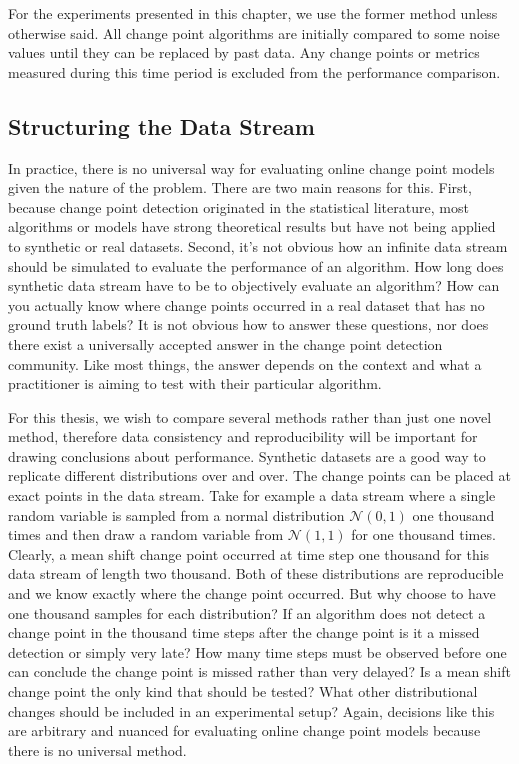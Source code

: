 For the experiments presented in this chapter, we use the former method unless otherwise said. All change point algorithms are initially compared to some noise values until they can be replaced by past data. Any change points or metrics measured during this time period is excluded from the performance comparison. %

\subsection{Structuring the Data Stream}
In practice, there is no universal way for evaluating online change point models given the nature of the problem. There are two main reasons for this. First, because change point detection originated in the statistical literature, most algorithms or models have strong theoretical results but have not being applied to synthetic or real datasets. Second, it's not obvious how an infinite data stream should be simulated to evaluate the performance of an algorithm. How long does synthetic data stream have to be to objectively evaluate an algorithm?  How can you actually know where change points occurred in a real dataset that has no ground truth labels? It is not obvious how to answer these questions, nor does there exist a universally accepted answer in the change point detection community. Like most things, the answer depends on the context and what a practitioner is aiming to test with their particular algorithm.  

For this thesis, we wish to compare several methods rather than just one novel method, therefore data consistency and reproducibility will be important for drawing conclusions about performance. Synthetic datasets are a good way to replicate different distributions over and over. The change points can be placed at exact points in the data stream. Take for example a data stream where a single random variable is sampled from a normal distribution $\mathcal{N}(0,1)$ one thousand times and then draw a random variable from $\mathcal{N}(1,1)$ for one thousand times. Clearly, a mean shift change point occurred at time step one thousand for this data stream of length two thousand. Both of these distributions are reproducible and we know exactly where the change point occurred. But why choose to have one thousand samples for each distribution? If an algorithm does not detect a change point in the thousand time steps after the change point is it a missed detection or simply very late? How many time steps must be observed before one can conclude the change point is missed rather than very delayed? Is a mean shift change point the only kind that should be tested? What other distributional changes should be included in an experimental setup? Again, decisions like this are arbitrary and nuanced for evaluating online change point models because there is no universal method. 

